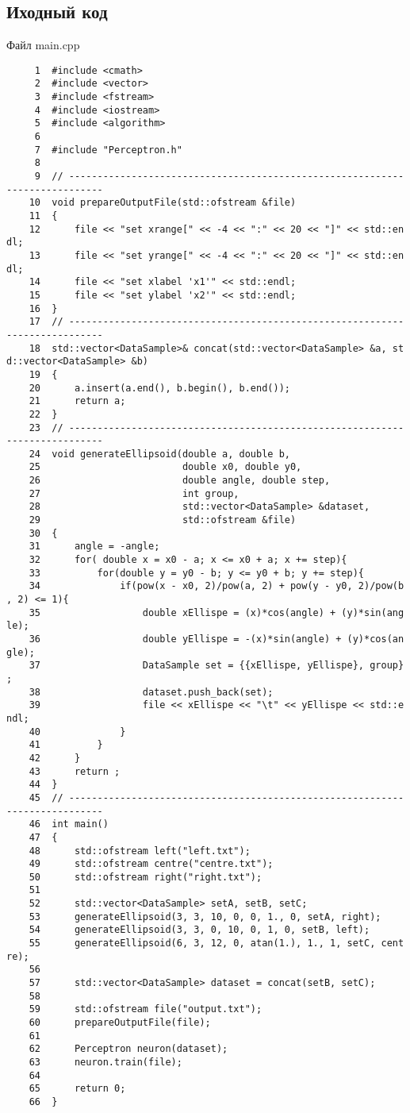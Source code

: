 \subsection{Иходный код}
Файл main.cpp
\begin{verbatim}
     1  #include <cmath>
     2  #include <vector>
     3  #include <fstream>
     4  #include <iostream>
     5  #include <algorithm>
     6
     7  #include "Perceptron.h"
     8
     9  // -----------------------------------------------------------
-----------------
    10  void prepareOutputFile(std::ofstream &file)
    11  {
    12      file << "set xrange[" << -4 << ":" << 20 << "]" << std::en
dl;
    13      file << "set yrange[" << -4 << ":" << 20 << "]" << std::en
dl;
    14      file << "set xlabel 'x1'" << std::endl;
    15      file << "set ylabel 'x2'" << std::endl;
    16  }
    17  // -----------------------------------------------------------
-----------------
    18  std::vector<DataSample>& concat(std::vector<DataSample> &a, st
d::vector<DataSample> &b)
    19  {
    20      a.insert(a.end(), b.begin(), b.end());
    21      return a;
    22  }
    23  // -----------------------------------------------------------
-----------------
    24  void generateEllipsoid(double a, double b, 
    25                         double x0, double y0, 
    26                         double angle, double step, 
    27                         int group,
    28                         std::vector<DataSample> &dataset,
    29                         std::ofstream &file)
    30  {
    31      angle = -angle; 
    32      for( double x = x0 - a; x <= x0 + a; x += step){
    33          for(double y = y0 - b; y <= y0 + b; y += step){
    34              if(pow(x - x0, 2)/pow(a, 2) + pow(y - y0, 2)/pow(b
, 2) <= 1){
    35                  double xEllispe = (x)*cos(angle) + (y)*sin(ang
le);
    36                  double yEllispe = -(x)*sin(angle) + (y)*cos(an
gle);
    37                  DataSample set = {{xEllispe, yEllispe}, group}
;
    38                  dataset.push_back(set);
    39                  file << xEllispe << "\t" << yEllispe << std::e
ndl;
    40              }
    41          }
    42      }
    43      return ;
    44  }
    45  // -----------------------------------------------------------
-----------------
    46  int main()
    47  {
    48      std::ofstream left("left.txt");
    49      std::ofstream centre("centre.txt");
    50      std::ofstream right("right.txt");
    51
    52      std::vector<DataSample> setA, setB, setC;
    53      generateEllipsoid(3, 3, 10, 0, 0, 1., 0, setA, right);
    54      generateEllipsoid(3, 3, 0, 10, 0, 1, 0, setB, left);
    55      generateEllipsoid(6, 3, 12, 0, atan(1.), 1., 1, setC, cent
re);
    56
    57      std::vector<DataSample> dataset = concat(setB, setC);
    58
    59      std::ofstream file("output.txt");
    60      prepareOutputFile(file);
    61
    62      Perceptron neuron(dataset);
    63      neuron.train(file);
    64
    65      return 0;
    66  }
\end{verbatim}

